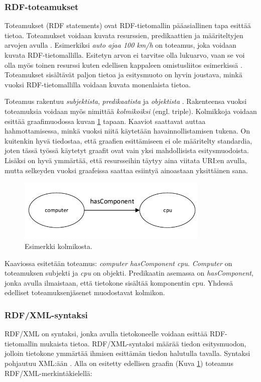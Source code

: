 \documentclass[finnish, 12pt, a4paper, elec, utf8, pdfa, online]{aaltothesis}
\begin{document}
\subsubsection{RDF-toteamukset}
Toteamukset (RDF statements) ovat RDF-tietomallin pääasiallinen tapa esittää tietoa. Toteamukset voidaan kuvata resurssien, predikaattien ja määriteltyjen arvojen avulla \cite{Antoniou}. Esimerkiksi \textit{auto ajaa 100 km/h} on toteamus, joka voidaan kuvata RDF-tietomallilla. Esitetyn arvon ei tarvitse olla lukuarvo, vaan se voi olla myös toinen resurssi kuten edellisen kappaleen omistusliitos esimerkissä \cite{Antoniou}\cite{IEEE_XML}. Toteamukset sisältävät paljon tietoa ja esitysmuoto on hyvin joustava, minkä vuoksi RDF-tietomallilla voidaan kuvata monenlaista tietoa.

Toteamus rakentuu \textit{subjektista}, \textit{predikaatista} ja \textit{objektista} \cite{lassila_dissertion}. Rakenteensa vuoksi toteamuksia voidaan myös nimittää \textit{kolmikoiksi} (engl. triple). Kolmikkoja voidaan esittää graafimuodossa kuvan \ref{images/RDF-triplet1} tapaan. Kaaviot saattavat auttaa hahmottamisessa, minkä vuoksi niitä käytetään havainnollistamisen tukena. On kuitenkin hyvä tiedostaa, että graafien esittämiseen ei ole määritelty standardia, joten tässä työssä käytetyt graafit ovat vain yksi mahdollisista esitysmuodoista. Lisäksi on hyvä ymmärtää, että resursseihin täytyy aina viitata URI:en avulla, mutta selkeyden vuoksi graafeissa saattaa esiintyä ainoastaan yksittäinen sana.

\begin{figure}[htb]
\centering
\includegraphics[height=3cm]{images/RDF-triplet.pdf}
\caption{Esimerkki kolmikosta. \label{images/RDF-triplet1}}
\end{figure}

Kaaviossa esitetään toteamus: \textit{computer hasComponent cpu}. \textit{Computer} on toteamuksen subjekti ja \textit{cpu} on objekti. Predikaatin asemassa on \textit{hasComponent}, jonka avulla ilmaistaan, että tietokone sisältää komponentin cpu. Yhdessä edelliset toteamuksenjäsenet muodostavat kolmikon.



\subsubsection{RDF/XML-syntaksi}
RDF/XML on syntaksi, jonka avulla tietokoneelle voidaan esittää RDF-tietomallin mukaista tietoa. RDF/XML-syntaksi määrää tiedon esitysmuodon, jolloin tietokone ymmärtää ihmisen esittämän tiedon halutulla tavalla. Syntaksi pohjautuu XML:ään \cite{RDF_XML}. Alla on esitetty edellisen graafin (Kuva \ref{images/RDF-triplet1}) toteamus RDF/XML-merkintäkielellä:
\end{document}

